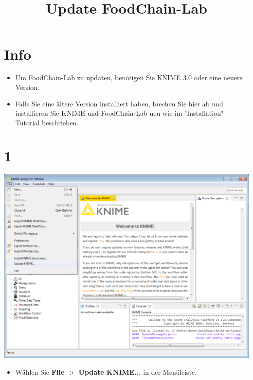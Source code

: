 \documentclass{beamer}
\title{Update FoodChain-Lab}
\date{}
\begin{document}
\maketitle

\section{Info}
\begin{frame}
	\begin{itemize}
		\item Um FoodChain-Lab zu updaten, benötigen Sie KNIME 3.0 oder eine neuere Version.
		\item Falls Sie eine ältere Version installiert haben, brechen Sie hier ab und installieren Sie KNIME und FoodChain-Lab neu wie im "Installation"-Tutorial beschrieben. 
	\end{itemize}
\end{frame}

\section{1}
\begin{frame}
	\begin{center}
  		\includegraphics[height=0.6\textheight]{1.png}
	\end{center}
	\begin{itemize}
		\item Wählen Sie \textbf{File $>$ Update KNIME...} in der Menüleiste.
	\end{itemize}
\end{frame}
\end{document}
